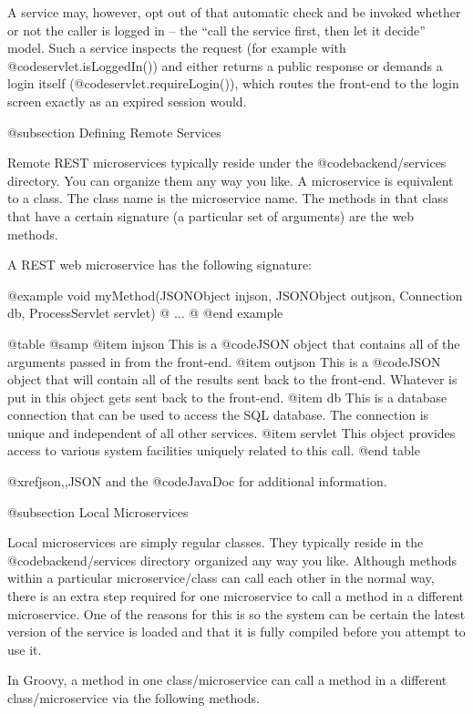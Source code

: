 A service may, however, opt out of that automatic check and be invoked
whether or not the caller is logged in -- the ``call the service first,
then let it decide'' model.  Such a service inspects the request (for
example with @code{servlet.isLoggedIn()}) and either returns a public
response or demands a login itself (@code{servlet.requireLogin()}), which
routes the front-end to the login screen exactly as an expired session
would.

@subsection Defining Remote Services

Remote REST microservices typically reside under the
@code{backend/services} directory.  You can organize them any way you
like.  A microservice is equivalent to a class.  The class name is the
microservice name.  The methods in that class that have a certain
signature (a particular set of arguments) are the web methods.

A REST web microservice has the following signature:

@example
void myMethod(JSONObject injson, 
              JSONObject outjson, 
              Connection db, 
              ProcessServlet servlet) @{
...
@}
@end example

@table @samp
@item injson
This is a @code{JSON} object that contains all of the arguments passed
in from the front-end.
@item outjson
This is a @code{JSON} object that will contain all of the results
sent back to the front-end.  Whatever is put in this object gets sent back to the front-end.
@item db
This is a database connection that can be used to access the SQL database.  The
connection is unique and independent of all other services.
@item servlet
This object provides access to various system facilities uniquely related
to this call.
@end table

@xref{json,,JSON} and the @code{JavaDoc} for additional information.


@subsection Local Microservices

Local microservices are simply regular classes.  They typically reside
in the @code{backend/services} directory organized any way you like.
Although methods within a particular microservice/class can call each
other in the normal way, there is an extra step required for one
microservice to call a method in a different microservice.  One of the
reasons for this is so the system can be certain the latest version of
the service is loaded and that it is fully compiled before you attempt
to use it.

In Groovy, a method in one class/microservice can call a method
in a different class/microservice via the following methods.


